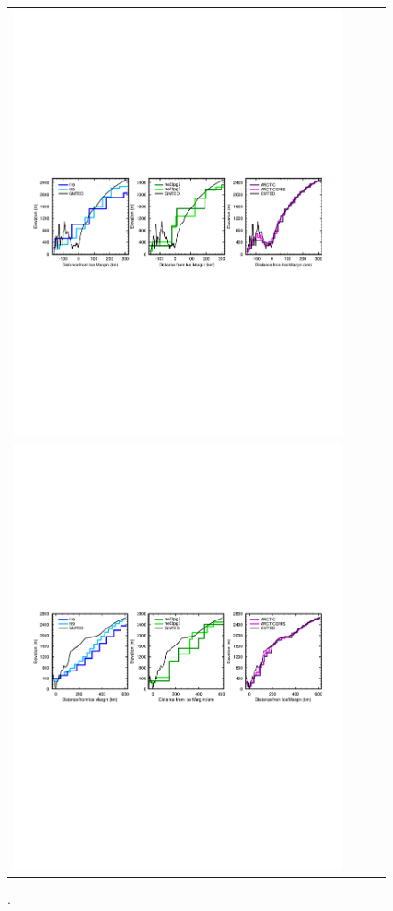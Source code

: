 \documentclass[draft]{agujournal2019}
\begin{document}
\begin{figure}[t]
\begin{center}
\begin{tabular}{cccc}
         \includegraphics[width=100mm]{figs/temp_ktransect.pdf} \\
         \includegraphics[width=100mm]{figs/temp_btransect.pdf} \\
\end{tabular}
\end{center}
\caption{.}
\label{fig:ztrans}
\end{figure}
\end{document}
